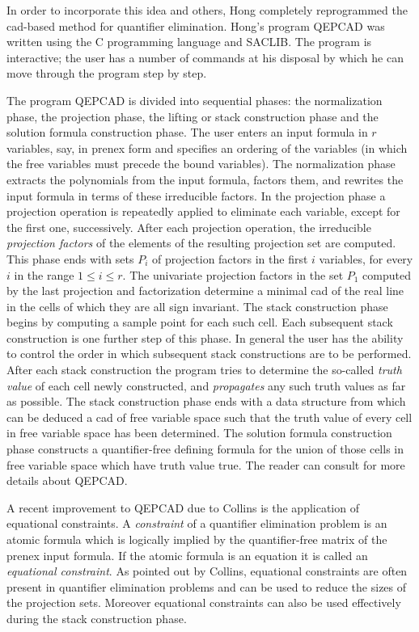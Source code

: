 In order to incorporate this idea and others, Hong \cite{Hong:90} completely
reprogrammed the cad-based method
for quantifier elimination. Hong's program QEPCAD was written using
the C programming language and SACLIB. The program is
interactive; the user has a number of commands at his disposal
by which he can move through the program step by step.

The program QEPCAD is divided into sequential phases:
the normalization phase, the projection phase, the lifting or
stack construction phase and the solution formula construction phase.
The user enters an input formula in $r$ variables, say, in prenex
form and specifies an ordering of the variables
(in which the free variables must precede the bound variables).
The normalization phase extracts the polynomials from the input
formula, factors them, and rewrites the input formula in terms of
these irreducible factors. In the projection phase
a projection operation is repeatedly applied to eliminate
each variable, except for the first one, successively.
After each projection operation, the irreducible {\em projection factors}
of the elements of the resulting projection set are computed.
This phase ends with sets $P_{i}$ of projection factors in the first
$i$ variables, for every $i$ in the range $1 \le i \le r$.
The univariate projection factors in
the set $P_{1}$ computed by the last projection and factorization
determine a minimal cad of the real line in the cells of
which they are all sign invariant. The stack construction phase
begins by computing a sample point for each such cell.
Each subsequent stack construction is one further step of this phase.
In general the user has the ability to control the order in which
subsequent stack constructions are to be performed.
After each stack construction the program tries to determine the
so-called {\em truth value} of each cell newly constructed,
and {\em propagates} any such truth values as far as possible.
The stack construction phase ends with a data structure from which
can be deduced a cad of free variable space such that the truth
value of every cell in free variable space has been determined.
The solution formula construction phase constructs a quantifier-free
defining formula for the union of those cells in free variable space
which have truth value true.
The reader can consult \cite{Collins_Hong:91} for more details about
QEPCAD.

A recent improvement to QEPCAD due to Collins \cite{Collins:95}
is the application of equational constraints.
A {\em constraint} of a quantifier elimination problem
is an atomic formula which is logically implied by the
quantifier-free matrix of the prenex input formula.
If the atomic formula is an equation
it is called an {\em equational constraint}.
As pointed out by Collins, equational constraints are often
present in quantifier elimination
problems and can be used to reduce the sizes of the projection sets.
Moreover equational constraints can also be used effectively
during the stack construction phase.

